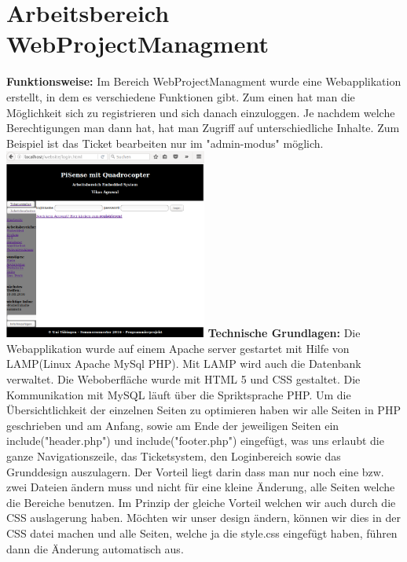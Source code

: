 \documentclass[fleqn,10pt]{SelfArx} %
\begin{document}
\section{Arbeitsbereich WebProjectManagment}
\textbf{Funktionsweise:} \newline 
Im Bereich WebProjectManagment wurde eine Webapplikation erstellt, in dem es verschiedene Funktionen gibt. Zum einen hat man die Möglichkeit sich zu registrieren und sich danach einzuloggen. Je nachdem welche Berechtigungen man dann hat, hat man Zugriff auf unterschiedliche Inhalte. Zum Beispiel ist das Ticket bearbeiten nur im "admin-modus" möglich.
\newline 
\includegraphics[width=0.5\textwidth]{Bild1.png} 
\newline 
\newline 
\textbf{Technische Grundlagen:} \newline 
Die Webapplikation wurde auf einem Apache server gestartet mit Hilfe von LAMP(Linux Apache MySql PHP). Mit LAMP wird auch die Datenbank verwaltet. Die Weboberfläche wurde mit HTML 5 und CSS gestaltet. Die Kommunikation mit MySQL läuft über die Spriktsprache PHP. Um die Übersichtlichkeit der einzelnen Seiten zu optimieren haben wir alle Seiten in PHP geschrieben und am Anfang, sowie am Ende der jeweiligen Seiten ein include("header.php") und include("footer.php") eingefügt, was uns erlaubt die ganze Navigationszeile, das Ticketsystem, den Loginbereich sowie das Grunddesign auszulagern. Der Vorteil liegt darin dass man nur noch eine bzw. zwei Dateien ändern muss und nicht für eine kleine Änderung, alle Seiten welche die Bereiche benutzen. Im Prinzip der gleiche Vorteil welchen wir auch durch die CSS auslagerung haben. Möchten wir unser design ändern, können wir dies in der CSS datei machen und alle Seiten, welche ja die style.css eingefügt haben, führen dann die Änderung automatisch aus. 
\newline 
\end{document}
